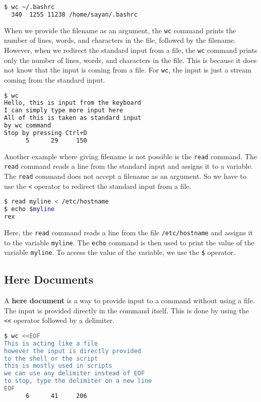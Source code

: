 \begin{lstlisting}[language=bash]
$ wc ~/.bashrc
  340  1255 11238 /home/sayan/.bashrc
\end{lstlisting}

When we provide the filename as an argument, the \texttt{wc} command
prints the number of lines, words, and characters in the file, followed
by the filename. However, when we redirect the standard input from a
file, the \texttt{wc} command prints only the number of lines, words,
and characters in the file. This is because it does not know that the
input is coming from a file. For \texttt{wc}, the input is just a stream
coming from the standard input.

\begin{lstlisting}[language=bash]
$ wc
Hello, this is input from the keyboard
I can simply type more input here
All of this is taken as standard input
by wc command
Stop by pressing Ctrl+D
      5      29     150
\end{lstlisting}

Another example where giving filename is not possible is the \texttt{read}
command. The \texttt{read} command reads a line from the standard input
and assigns it to a variable. The \texttt{read} command does not accept
a filename as an argument. So we have to use the \texttt{<} operator to
redirect the standard input from a file.

\begin{lstlisting}[language=bash]
$ read myline < /etc/hostname
$ echo $myline
rex
\end{lstlisting}

Here, the \texttt{read} command reads a line from the file \texttt{/etc/hostname}
and assigns it to the variable \texttt{myline}. The \texttt{echo} command
is then used to print the value of the variable \texttt{myline}.
To access the value of the variable, we use the \texttt{\$} operator.

\subsection{Here Documents}

A \textbf{here document} is a way to provide input to a command without
using a file. The input is provided directly in the command itself.
This is done by using the \texttt{<<} operator followed by a delimiter.

\begin{lstlisting}[language=bash]
$ wc <<EOF
This is acting like a file
however the input is directly provided
to the shell or the script
this is mostly used in scripts
we can use any delimiter instead of EOF
to stop, type the delimiter on a new line
EOF
      6      41     206
\end{lstlisting}

